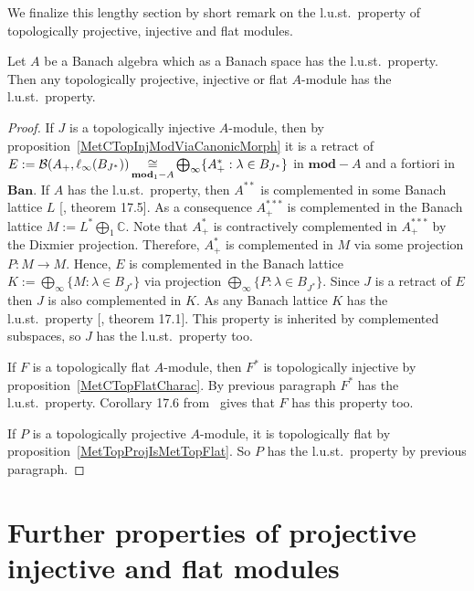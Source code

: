 We finalize this lengthy section by short remark on the l.u.st.\ property of
topologically projective, injective and flat modules. 

\begin{proposition} Let $A$ be a Banach algebra which as a Banach space has the
l.u.st.\ property. Then any topologically projective, injective or flat
$A$-module has the l.u.st.\ property.
\end{proposition}
\begin{proof} 

If $J$ is a topologically injective $A$-module, then by
proposition~\ref{MetCTopInjModViaCanonicMorph} it is a retract of
$E:=\mathcal{B}(A_+,\ell_\infty(B_{J^*}))
\mathop{\mathbin{\cong}}\limits_{\mathbf{mod}_1-A}
\bigoplus_\infty \{ A_+^*:\lambda\in B_{J^*} \}$ 
in $\mathbf{mod}-A$ and a fortiori in $\mathbf{Ban}$. If $A$ has 
the l.u.st.\ property, then $A^{**}$ is complemented
in some Banach lattice $L$ [\cite{DiestAbsSumOps}, theorem 17.5]. As a
consequence $A_+^{***}$ is complemented in the Banach lattice
$M:=L^*\bigoplus_1\mathbb{C}$. Note that $A_+^*$ is contractively
complemented in $A_+^{***}$ by the Dixmier projection. Therefore, $A_+^*$ is 
complemented in $M$ via some projection $P:M\to M$. Hence, $E$ is
complemented in the Banach lattice $K:=\bigoplus_\infty \{M:\lambda\in B_{J^*} \}$
via projection $\bigoplus_\infty \{P:\lambda\in B_{J^*} \}$. Since $J$ is a 
retract of $E$ then $J$ is also complemented in $K$. As any Banach 
lattice $K$ has the l.u.st.\ property [\cite{DiestAbsSumOps}, theorem 17.1]. 
This property is inherited by complemented subspaces, so $J$ has the l.u.st.\ 
property too.

If $F$ is a topologically flat $A$-module, then $F^*$ is topologically injective
by proposition~\ref{MetCTopFlatCharac}. By previous paragraph $F^*$ has the
l.u.st.\ property. Corollary 17.6 from~\cite{DiestAbsSumOps} gives that $F$ has
this property too.

If $P$ is a topologically projective $A$-module, it is topologically flat by
proposition~\ref{MetTopProjIsMetTopFlat}. So $P$ has the l.u.st.\ property by
previous paragraph.
\end{proof}


\section{
    Further properties of projective injective and flat modules}\label{
SectionFurtherPropertiesOfProjectiveInjectiveAndFlatModules}

